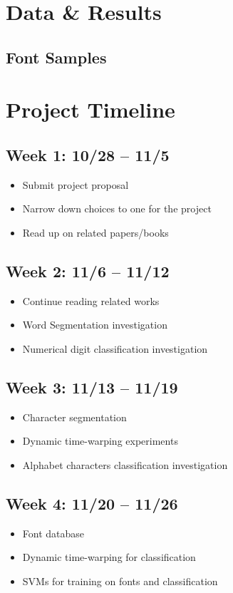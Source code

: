 \documentclass[12pt]{article}
\begin{document}
\appendix
	\section{Data \& Results}
		\subsection{Font Samples}
		\label{appendix:data:font}
	\section{Project Timeline}
		\subsection*{Week 1: 10/28 -- 11/5 }
			\begin{itemize}
				\item{Submit project proposal}
				\item{Narrow down choices to one for the project}
				\item{Read up on related papers/books}
			\end{itemize}
		\subsection*{Week 2: 11/6 -- 11/12  }
			\begin{itemize}
				\item{Continue reading related works}
				\item{Word Segmentation investigation}
				\item{Numerical digit classification investigation}
			\end{itemize}
		\subsection*{Week 3: 11/13 -- 11/19}
			\begin{itemize}
				\item{Character segmentation}
				\item{Dynamic time-warping experiments}
				\item{Alphabet characters classification investigation}
			\end{itemize}
		\subsection*{Week 4: 11/20 -- 11/26}
			\begin{itemize}
				\item{Font database}
				\item{Dynamic time-warping for classification}
				\item{SVMs for training on fonts and classification}
			\end{itemize}
\end{document}

